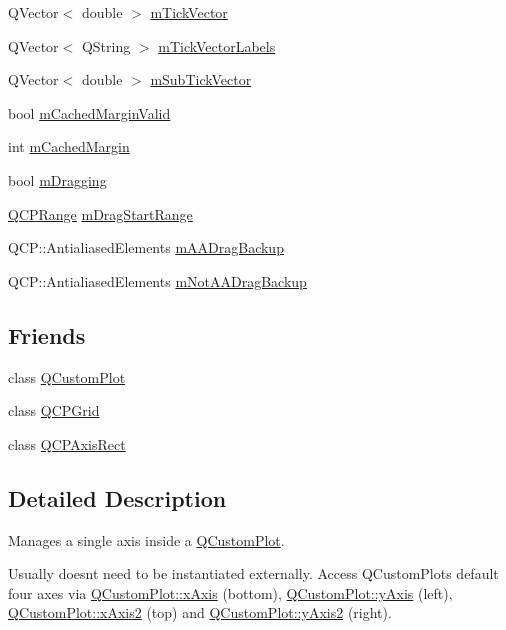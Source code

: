 \begin{DoxyCompactItemize}
\item 
Q\+Vector$<$ double $>$ \hyperlink{class_q_c_p_axis_aae0f9b9973b85be601200f00f5825087}{m\+Tick\+Vector}
\item 
Q\+Vector$<$ Q\+String $>$ \hyperlink{class_q_c_p_axis_aeee4bd0fca3f587eafe33843d1cb4f82}{m\+Tick\+Vector\+Labels}
\item 
Q\+Vector$<$ double $>$ \hyperlink{class_q_c_p_axis_a28353081e0ff35c3fe5ced923a287faa}{m\+Sub\+Tick\+Vector}
\item 
bool \hyperlink{class_q_c_p_axis_a2cde37b6e385f47e11322df4ac1b0e9b}{m\+Cached\+Margin\+Valid}
\item 
int \hyperlink{class_q_c_p_axis_a48ace55cbd54f7241e7f1b06fd369b64}{m\+Cached\+Margin}
\item 
bool \hyperlink{class_q_c_p_axis_ad56b9be14ed8ae9b858d84bdb539b1ca}{m\+Dragging}
\item 
\hyperlink{class_q_c_p_range}{Q\+C\+P\+Range} \hyperlink{class_q_c_p_axis_a4b665f97d37727f0013b93d727e80bd2}{m\+Drag\+Start\+Range}
\item 
Q\+C\+P\+::\+Antialiased\+Elements \hyperlink{class_q_c_p_axis_a9c34e6f92eda5803e7ce4ea3322a6417}{m\+A\+A\+Drag\+Backup}
\item 
Q\+C\+P\+::\+Antialiased\+Elements \hyperlink{class_q_c_p_axis_a0be1bc05fcbf86bd9916cc8faa55dd78}{m\+Not\+A\+A\+Drag\+Backup}
\end{DoxyCompactItemize}
\subsection*{Friends}
\begin{DoxyCompactItemize}
\item 
class \hyperlink{class_q_c_p_axis_a1cdf9df76adcfae45261690aa0ca2198}{Q\+Custom\+Plot}
\item 
class \hyperlink{class_q_c_p_axis_a061e177f585549fc31f780852e2bd6fe}{Q\+C\+P\+Grid}
\item 
class \hyperlink{class_q_c_p_axis_acbf20ecb140f66c5fd1bc64ae0762990}{Q\+C\+P\+Axis\+Rect}
\end{DoxyCompactItemize}


\subsection{Detailed Description}
Manages a single axis inside a \hyperlink{class_q_custom_plot}{Q\+Custom\+Plot}. 

Usually doesn\textquotesingle{}t need to be instantiated externally. Access Q\+Custom\+Plot\textquotesingle{}s default four axes via \hyperlink{class_q_custom_plot_a9a79cd0158a4c7f30cbc702f0fd800e4}{Q\+Custom\+Plot\+::x\+Axis} (bottom), \hyperlink{class_q_custom_plot_af6fea5679725b152c14facd920b19367}{Q\+Custom\+Plot\+::y\+Axis} (left), \hyperlink{class_q_custom_plot_ada41599f22cad901c030f3dcbdd82fd9}{Q\+Custom\+Plot\+::x\+Axis2} (top) and \hyperlink{class_q_custom_plot_af13fdc5bce7d0fabd640f13ba805c0b7}{Q\+Custom\+Plot\+::y\+Axis2} (right).

